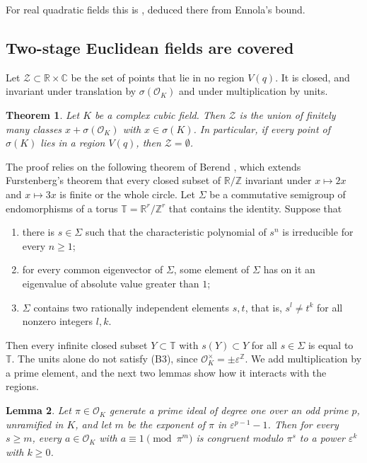 \documentclass[11pt]{amsart}
\newtheorem{theorem}{Theorem}[section]
\newtheorem{lemma}[theorem]{Lemma}
\theoremstyle{definition}
\theoremstyle{remark}
\numberwithin{equation}{section}
\newcommand{\Z}{\mathbb{Z}}
\newcommand{\R}{\mathbb{R}}
\newcommand{\C}{\mathbb{C}}
\newcommand{\cO}{\mathcal{O}}
\begin{document}
For real quadratic fields this is \cite[Theorem~4.3]{GM}, deduced there from Ennola's bound.

\subsection{Two-stage Euclidean fields are covered}\label{sec:berend}
Let $\mathcal Z\subset\R\times\C$ be the set of points that lie in no region $V(q)$. It is closed, and
invariant under translation by $\sigma(\cO_K)$ and under multiplication by units.

\begin{theorem}\label{thm:uncovered}
Let $K$ be a complex cubic field. Then $\mathcal Z$ is the union of finitely many classes
$x+\sigma(\cO_K)$ with $x\in\sigma(K)$. In particular, if every point of $\sigma(K)$ lies in a
region $V(q)$, then $\mathcal Z=\emptyset$.
\end{theorem}

The proof relies on the following theorem of Berend \cite[Theorem~2.1]{Be}, which extends
Furstenberg's theorem that every closed subset of $\R/\Z$ invariant under $x\mapsto 2x$ and
$x\mapsto3x$ is finite or the whole circle. Let $\Sigma$ be a commutative semigroup of
endomorphisms of a torus $\mathbb T=\R^r/\Z^r$ that contains the identity. Suppose that
\begin{enumerate}
\item[(B1)] there is $s\in\Sigma$ such that the characteristic polynomial of $s^n$ is
irreducible for every $n\ge1$;
\item[(B2)] for every common eigenvector of $\Sigma$, some element of $\Sigma$ has on it an
eigenvalue of absolute value greater than $1$;
\item[(B3)] $\Sigma$ contains two rationally independent elements $s,t$, that is, $s^l\ne t^k$
for all nonzero integers $l,k$.
\end{enumerate}
Then every infinite closed subset $Y\subset\mathbb T$ with $s(Y)\subset Y$ for all
$s\in\Sigma$ is equal to $\mathbb T$. The units alone do not satisfy (B3), since
$\cO_K^\times=\pm\varepsilon^{\Z}$. We add multiplication by a prime element, and the next two
lemmas show how it interacts with the regions.

\begin{lemma}\label{lem:padic}
Let $\pi\in\cO_K$ generate a prime ideal of degree one over an odd prime $p$, unramified in
$K$, and let $m$ be the exponent of $\pi$ in $\varepsilon^{p-1}-1$. Then for every $s\ge m$, every
$a\in\cO_K$ with $a\equiv1\pmod{\pi^m}$ is congruent modulo $\pi^s$ to a power $\varepsilon^k$
with $k\ge0$.
\end{lemma}
\end{document}
